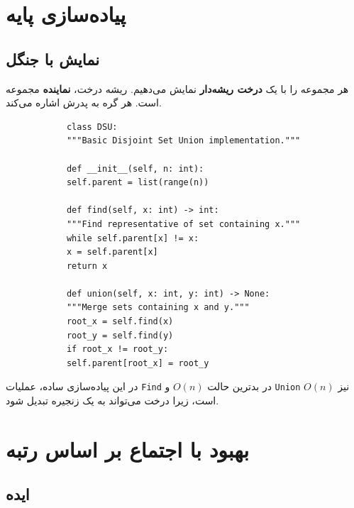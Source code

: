 \documentclass{matinbook}
\begin{document}
    \section{پیاده‌سازی پایه}
    
    \subsection{نمایش با جنگل}
    
    هر مجموعه را با یک \textbf{درخت ریشه‌دار}
    نمایش می‌دهیم. ریشه درخت، \textbf{نماینده}
    مجموعه است. هر گره به پدرش اشاره می‌کند.
    
    \begin{latin}
        \begin{verbatim}
            class DSU:
            """Basic Disjoint Set Union implementation."""
            
            def __init__(self, n: int):
            self.parent = list(range(n))
            
            def find(self, x: int) -> int:
            """Find representative of set containing x."""
            while self.parent[x] != x:
            x = self.parent[x]
            return x
            
            def union(self, x: int, y: int) -> None:
            """Merge sets containing x and y."""
            root_x = self.find(x)
            root_y = self.find(y)
            if root_x != root_y:
            self.parent[root_x] = root_y
        \end{verbatim}
    \end{latin}
    \label{code:dsu-basic}
    
    \begin{remark}
        در این پیاده‌سازی ساده،
        عملیات \texttt{Find} در بدترین حالت $O(n)$
        و \texttt{Union} نیز $O(n)$ است،
        زیرا درخت می‌تواند به یک زنجیره تبدیل شود.
        \label{rem:dsu-basic-worst}
    \end{remark}
    
    \section{بهبود با اجتماع بر اساس رتبه}
    
    \subsection{ایده}
    
\end{document}
